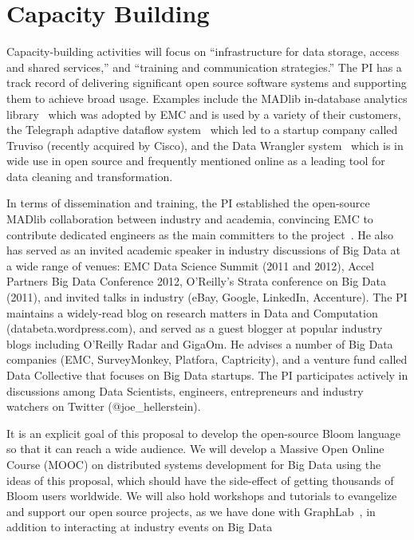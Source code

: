 \section{Capacity Building}
\label{sec:capacity}
Capacity-building activities will focus on ``infrastructure for data
storage, access and shared services,'' and ``training and
communication strategies.''  The PI has a track record of
delivering significant open source software systems and
supporting them to achieve broad usage.  Examples include the MADlib in-database analytics library~\cite{madlib} which
was adopted by EMC and is used by a variety of their customers, the Telegraph adaptive dataflow system~\cite{telegraph} which led to a startup company called Truviso (recently acquired by Cisco), and the Data Wrangler system~\cite{datawrangler} which is in wide use in open source and frequently mentioned online as a leading tool for data cleaning and transformation.  

In
terms of dissemination and training, the PI established the open-source MADlib
  collaboration between industry and academia, convincing EMC to
  contribute dedicated engineers as the main committers to the project~\cite{madlib}.  He also has served as an invited academic
  speaker in industry discussions of Big Data at a wide range of venues: EMC Data Science Summit (2011
  and 2012), Accel Partners Big Data Conference 2012,
  O'Reilly's Strata conference on Big Data (2011), and invited talks in
  industry (eBay, Google, LinkedIn, Accenture).  The PI maintains a widely-read blog on
  research matters in Data and Computation (databeta.wordpress.com),
  and served as a guest blogger at popular industry blogs including
  O'Reilly Radar and GigaOm.  He advises a number of Big Data companies
  (EMC, SurveyMonkey, Platfora, Captricity), and 
  a venture fund called Data Collective that focuses on Big Data
  startups. The PI participates actively in discussions among Data
  Scientists, engineers, entrepreneurs and industry watchers on
  Twitter (@joe\_hellerstein).

It is an explicit goal of this proposal to develop the open-source
Bloom language so that it can reach a wide
audience.  We will develop a Massive Open Online Course (MOOC) on distributed systems development for Big Data using the ideas of this proposal, which should have the side-effect of getting thousands of Bloom users worldwide.  We will also hold workshops and tutorials to
evangelize and support our open source projects, as we have done with
GraphLab~\cite{graphlab}, in addition to interacting at industry events on
Big Data

